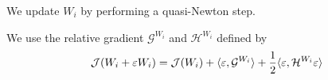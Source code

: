 We update $W_i$ by performing a quasi-Newton step. 

We use the relative gradient $\mathcal{G}^{W_i}$ and $\mathcal{H}^{W_i}$ defined
by
\begin{align}
\mathcal{J}(W_i + \varepsilon W_i) = \mathcal{J}(W_i) + \langle{ \varepsilon},{\mathcal{G}^{W_i}}\rangle + \frac12 \langle{ \varepsilon},{\mathcal{H}^{W_i} \varepsilon }\rangle
\end{align}

